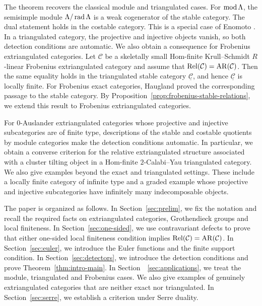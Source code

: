 \documentclass[11pt, twoside]{article}
\def\C{\mathcal{C}}
\numberwithin{equation}{section}
\begin{document}
The theorem recovers the classical module and triangulated cases.  For
$\operatorname{mod}\Lambda$, the semisimple module $\Lambda/\operatorname{rad}\Lambda$ is a weak
cogenerator of the stable category.  The dual statement holds in the
costable category.  This is a special case of Enomoto
\cite[Proposition~4.7]{Enomoto2019}.  In a triangulated category, the
projective and injective objects vanish, so both detection conditions are
automatic. We also obtain a consequence for Frobenius extriangulated categories.  Let
$\C$ be a skeletally small Hom-finite Krull--Schmidt $R$-linear Frobenius
extriangulated category and assume that $\Rel(\C)=\AR(\C)$.  Then the same
equality holds in the triangulated stable category $\underline{\C}$, and
hence $\underline{\C}$ is locally finite.  For Frobenius exact categories,
Haugland \cite[Lemma~3.2]{Haugland2022} proved the corresponding passage to
the stable category.  By Proposition~\ref{prop:frobenius-stable-relations},
we extend this result to Frobenius extriangulated categories.

For $0$-Auslander extriangulated categories whose projective and injective
subcategories are of finite type, descriptions of the stable and costable
quotients by module categories make the detection conditions automatic.  In
particular, we obtain a converse criterion for the relative extriangulated
structure associated with a cluster tilting object in a Hom-finite
$2$-Calabi--Yau triangulated category.  We also give examples beyond the
exact and triangulated settings.  These include a locally finite category of
infinite type and a graded example whose projective and injective
subcategories have infinitely many indecomposable objects.

The paper is organized as follows.  In Section~\ref{sec:prelim}, we fix the notation and recall the required facts on extriangulated categories, Grothendieck groups and local finiteness.  In Section~\ref{sec:one-sided}, we use contravariant defects to prove that either one-sided local finiteness condition implies $\Rel(\C)=\AR(\C)$.  In Section~\ref{sec:euler}, we introduce the Euler functions and the finite support condition.  In Section~\ref{sec:detectors}, we introduce the detection conditions and prove Theorem~\ref{thm:intro-main}. In Section~~\ref{sec:applications}, we treat the module, triangulated and Frobenius cases. We also give examples of genuinely extriangulated categories that are neither exact nor triangulated.  In Section~\ref{sec:serre}, we establish a criterion under Serre duality.
\end{document}
